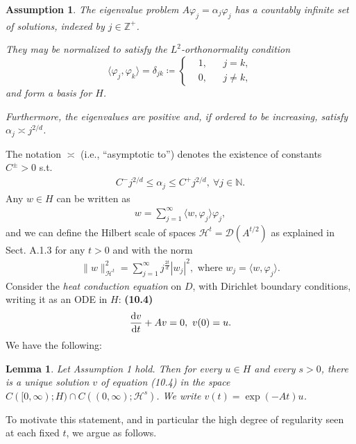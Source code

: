 \documentclass[oneside]{article}
\numberwithin{equation}{section}
\newtheorem{assumption}{Assumption}[section]
\newtheorem{lemma}{Lemma}[section]
\begin{document}
\begin{assumption}
    The eigenvalue problem $A\varphi_j = \alpha_j\varphi_j$ has a countably infinite set of solutions, indexed by $j\in\mathbb{Z}^+$.
    
    They may be normalized to satisfy the $L^2$-orthonormality condition
    \begin{equation*}
        \langle\varphi_j,\varphi_k\rangle = \delta_{jk}\coloneqq\left\{\begin{split}
            &1, &&j = k,\\
            &0, &&j\ne k,
        \end{split}\right.
    \end{equation*}
    and form a basis for $H$.
    
    Furthermore, the eigenvalues are positive and, if ordered to be increasing, satisfy $\alpha_j\asymp j^{2/d}$.
\end{assumption}
The notation $\asymp$ (i.e., ``asymptotic to'') denotes the existence of constants $C^\pm > 0$ s.t.
\begin{align*}
    C^-j^{2/d}\le\alpha_j\le C^+j^{2/d},\ \forall j\in\mathbb{N}.
\end{align*}
Any $w\in H$ can be written as
\begin{align*}
    w = \sum_{j=1}^\infty \langle w,\varphi_j\rangle\varphi_j,
\end{align*}
and we can define the Hilbert scale of spaces $\mathcal{H}^t = \mathcal{D}(A^{t/2})$ as explained in Sect. A.1.3 for any $t > 0$ and with the norm
\begin{align*}
    \|w\|_{\mathcal{H}^t}^2 = \sum_{j=1}^\infty j^{\frac{2t}{d}}|w_j|^2, \mbox{ where } w_j = \langle w,\varphi_j\rangle.
\end{align*}
Consider the \textit{heat conduction equation} on $D$, with Dirichlet boundary conditions, writing it as an ODE in $H$: \textbf{(10.4)}
\begin{align*}
    \frac{{\rm d}v}{{\rm d}t} + Av = 0,\ v(0) = u.
\end{align*}
We have the following:

\begin{lemma}
    Let Assumption 1 hold. Then for every $u\in H$ and every $s > 0$, there is a unique solution $v$ of equation (10.4) in the space $C([0,\infty);H)\cap C((0,\infty);\mathcal{H}^s)$. We write $v(t) = \exp(-At)u$.
\end{lemma}
To motivate this statement, and in particular the high degree of regularity seen at each fixed $t$, we argue as follows.
\end{document}
